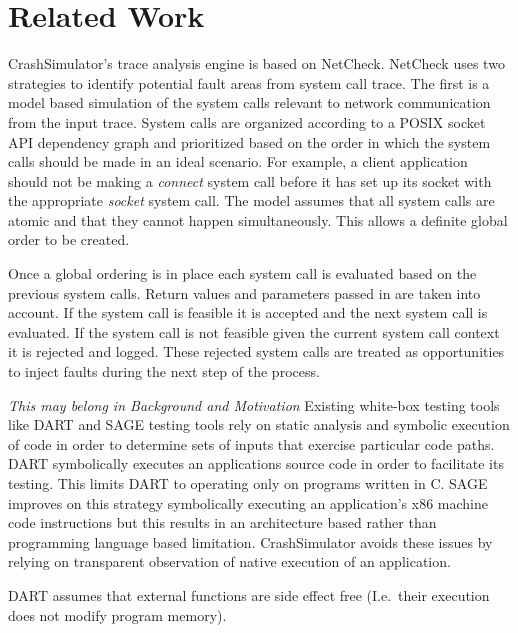 \section{Related Work}

CrashSimulator's trace analysis engine is based on NetCheck. NetCheck uses two strategies
    to identify potential fault areas from system call trace. The first is a model based simulation of the system calls
    relevant to network communication from the input trace. System calls are organized according to a POSIX socket API
    dependency graph and prioritized based on the order in which the system calls should be made in an ideal scenario.
    For example, a client application should not be making a \emph{connect} system call before it has set up its
    socket with the appropriate \emph{socket} system call. The model assumes that all system calls are atomic and that
    they cannot happen simultaneously. This allows a definite global order to be created.

    Once a global ordering is in place each system call is evaluated based on the previous system calls. Return values
    and parameters passed in are taken into account. If the system call is feasible it is accepted and the next system
    call is evaluated. If the system call is not feasible given the current system call context it is rejected and
    logged. These rejected system calls are treated as opportunities to inject faults during the next step of the
    process.

\emph{This may belong in Background and Motivation} Existing white-box testing tools like DART and SAGE testing
    tools rely on static analysis and symbolic execution of code in order to determine sets of inputs that exercise
    particular code paths. DART symbolically executes an applications source code in order to facilitate its testing.
    This limits DART to operating only on programs written in C. SAGE improves on this strategy symbolically executing
    an application's x86 machine code instructions but this results in an architecture based rather than programming
    language based limitation. CrashSimulator avoids these issues by relying on transparent observation of native
    execution of an application.

DART assumes that external
    functions are side effect free (I.e.\ their execution does not modify program memory).
